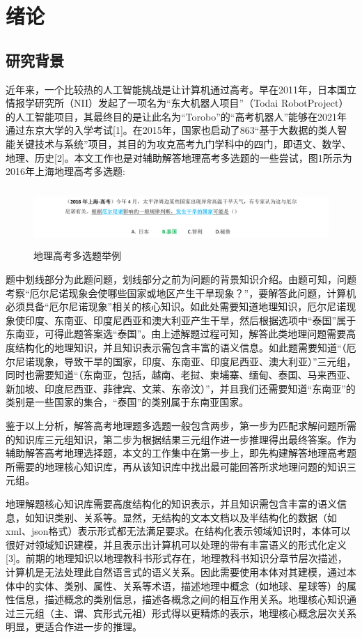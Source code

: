 \chapter{绪论}
\section{研究背景}
近年来，一个比较热的人工智能挑战是让计算机通过高考。早在2011年，日本国立情报学研究所（NII）发起了一项名为“东大机器人项目”（Todai RobotProject）的人工智能项目，其最终目的是让此名为“Torobo”的“高考机器人”能够在2021年通过东京大学的入学考试[1]。在2015年，国家也启动了863“基于大数据的类人智能关键技术与系统”项目，其目的为攻克高考九门学科中的四门，即语文、数学、地理、历史[2]。本文工作也是对辅助解答地理高考多选题的一些尝试，图1所示为2016年上海地理高考多选题:

\begin{figure}[!htb]
	\centering\includegraphics[height=2.2cm]{resource/ex_multi_choice_ques}
	\caption{地理高考多选题举例}
	\label{fig:ex_multi_choice_ques}
\end{figure}

题中划线部分为此题问题，划线部分之前为问题的背景知识介绍。由题可知，问题考察“厄尔尼诺现象会使哪些国家或地区产生干旱现象？”，要解答此问题，计算机必须具备“厄尔尼诺现象”相关的核心知识。如此处需要知道地理知识，厄尔尼诺现象使印度、东南亚、印度尼西亚和澳大利亚产生干旱，然后根据选项中“泰国”属于东南亚，可得此题答案选“泰国”。由上述解题过程可知，解答此类地理问题需要高度结构化的地理知识，并且知识表示需包含丰富的语义信息。如此题需要知道“（厄尔尼诺现象，导致干旱的国家，印度、东南亚、印度尼西亚、澳大利亚）”三元组，同时也需要知道“（东南亚，包括，越南、老挝、柬埔寨、缅甸、泰国、马来西亚、新加坡、印度尼西亚、菲律宾、文莱、东帝汶）”，并且我们还需要知道“东南亚”的类别是一些国家的集合，“泰国”的类别属于东南亚国家。

鉴于以上分析，解答高考地理题多选题一般包含两步，第一步为匹配求解问题所需的知识库三元组知识，第二步为根据结果三元组作进一步推理得出最终答案。作为辅助解答高考地理选择题，本文的工作集中在第一步上，即先构建解答地理高考题所需要的地理核心知识库，再从该知识库中找出最可能回答所求地理问题的知识三元组。

地理解题核心知识库需要高度结构化的知识表示，并且知识需包含丰富的语义信息，如知识类别、关系等。显然，无结构的文本文档以及半结构化的数据（如xml、json格式）表示形式都无法满足要求。在结构化表示领域知识时，本体可以很好对领域知识建模，并且表示出计算机可以处理的带有丰富语义的形式化定义[3]。前期的地理知识以地理教科书形式存在，地理教科书知识分章节层次描述，计算机是无法处理此自然语言式的语义关系。因此需要使用本体对其建模，通过本体中的实体、类别、属性、关系等术语，描述地理中概念（如地球、星球等）的属性信息，描述概念的类别信息，描述各概念之间的相互作用关系。地理核心知识通过三元组（主、谓、宾形式元祖）形式得以更精炼的表示，地理核心概念层次关系明显，更适合作进一步的推理。

